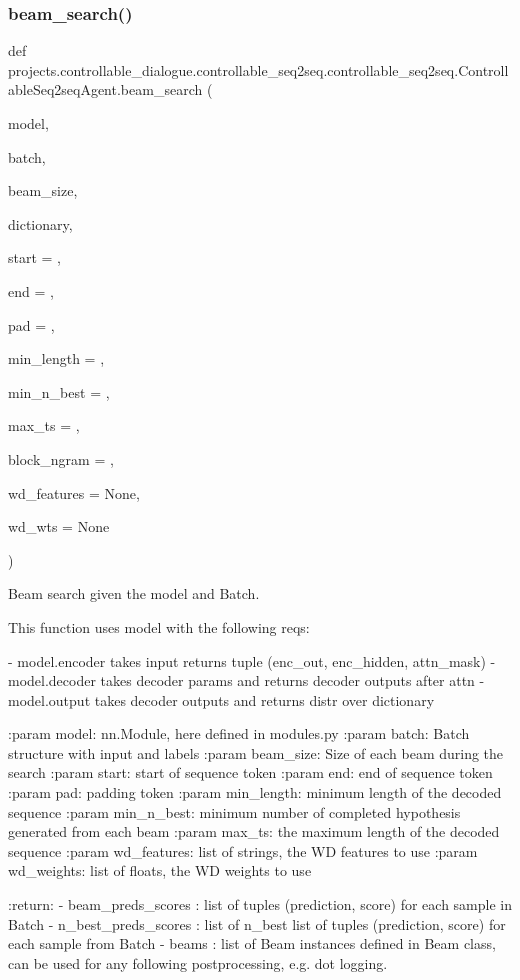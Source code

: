 \subsubsection{\texorpdfstring{beam\+\_\+search()}{beam\_search()}}
{\footnotesize\ttfamily def projects.\+controllable\+\_\+dialogue.\+controllable\+\_\+seq2seq.\+controllable\+\_\+seq2seq.\+Controllable\+Seq2seq\+Agent.\+beam\+\_\+search (\begin{DoxyParamCaption}\item[{}]{model,  }\item[{}]{batch,  }\item[{}]{beam\+\_\+size,  }\item[{}]{dictionary,  }\item[{}]{start = {},  }\item[{}]{end = {},  }\item[{}]{pad = {},  }\item[{}]{min\+\_\+length = {},  }\item[{}]{min\+\_\+n\+\_\+best = {},  }\item[{}]{max\+\_\+ts = {},  }\item[{}]{block\+\_\+ngram = {},  }\item[{}]{wd\+\_\+features = {\ttfamily None},  }\item[{}]{wd\+\_\+wts = {\ttfamily None} }\end{DoxyParamCaption})\hspace{0.3cm}{\ttfamily [static]}}

\begin{DoxyVerb}Beam search given the model and Batch.

This function uses model with the following reqs:

- model.encoder takes input returns tuple (enc_out, enc_hidden, attn_mask)
- model.decoder takes decoder params and returns decoder outputs after attn
- model.output takes decoder outputs and returns distr over dictionary

:param model: nn.Module, here defined in modules.py
:param batch: Batch structure with input and labels
:param beam_size: Size of each beam during the search
:param start: start of sequence token
:param end: end of sequence token
:param pad: padding token
:param min_length: minimum length of the decoded sequence
:param min_n_best: minimum number of completed hypothesis generated
    from each beam
:param max_ts: the maximum length of the decoded sequence
:param wd_features: list of strings, the WD features to use
:param wd_weights: list of floats, the WD weights to use

:return:
    - beam_preds_scores : list of tuples (prediction, score) for each
      sample in Batch
    - n_best_preds_scores : list of n_best list of tuples (prediction,
      score) for each sample from Batch
    - beams : list of Beam instances defined in Beam class, can be used
      for any following postprocessing, e.g. dot logging.
\end{DoxyVerb}
 

